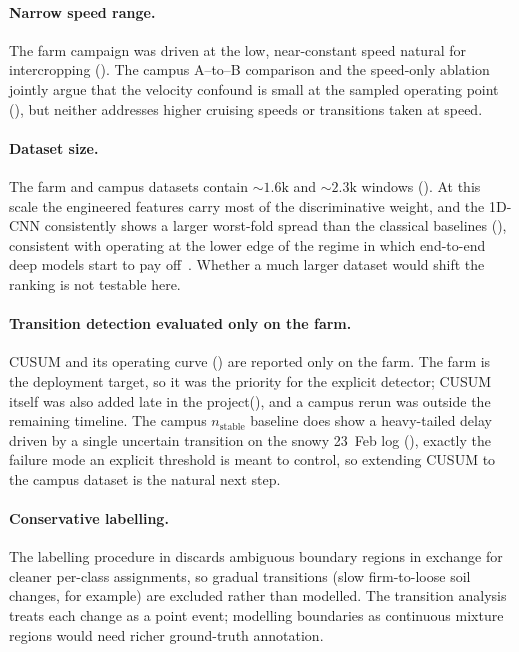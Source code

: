 \paragraph{Narrow speed range.} The farm campaign was driven at the low, near-constant speed natural for intercropping (). The campus A--to--B comparison and the speed-only ablation jointly argue that the velocity confound is small at the sampled operating point (), but neither addresses higher cruising speeds or transitions taken at speed.

\paragraph{Dataset size.} The farm and campus datasets contain $\sim 1.6\text{k}$ and $\sim 2.3\text{k}$ windows (). At this scale the engineered features carry most of the discriminative weight, and the 1D-CNN consistently shows a larger worst-fold spread than the classical baselines (), consistent with operating at the lower edge of the regime in which end-to-end deep models start to pay off~\cite{Wang2017,Fawaz2019}. Whether a much larger dataset would shift the ranking is not testable here.

\paragraph{Transition detection evaluated only on the farm.} CUSUM and its operating curve () are reported only on the farm. The farm is the deployment target, so it was the priority for the explicit detector; CUSUM itself was also added late in the project(), and a campus rerun was outside the remaining timeline. The campus $n_{\text{stable}}$ baseline does show a heavy-tailed delay driven by a single uncertain transition on the snowy 23~Feb log (), exactly the failure mode an explicit threshold is meant to control, so extending CUSUM to the campus dataset is the natural next step.

\paragraph{Conservative labelling.} The labelling procedure in  discards ambiguous boundary regions in exchange for cleaner per-class assignments, so gradual transitions (slow firm-to-loose soil changes, for example) are excluded rather than modelled. The transition analysis treats each change as a point event; modelling boundaries as continuous mixture regions would need richer ground-truth annotation.

